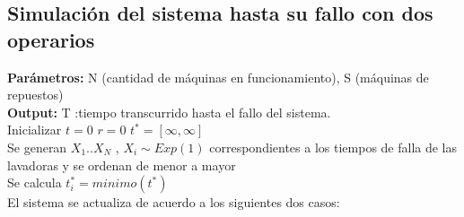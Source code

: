 \documentclass[11pt, spanish, a4paper]{article}
\begin{document}
\subsection{Simulaci\'on del sistema hasta su fallo con dos operarios}

\textbf{Par\'ametros:} N (cantidad de m\'aquinas en funcionamiento), S (m\'aquinas de repuestos)\\
\textbf{Output: }T :tiempo transcurrido hasta el fallo del sistema.\\
Inicializar $t=0$ $r=0$ $t^*=[\infty,\infty]$ \\
Se generan $X_1 .. X_N$ , $X_i \sim Exp(1)$ correspondientes a los tiempos de falla de las lavadoras y se ordenan de menor a mayor\\
Se calcula $t^*_i = minimo(t^*)$\\
El sistema se actualiza de acuerdo a los siguientes dos casos:
\end{document}
